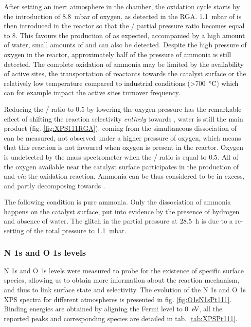 After setting an inert atmosphere in the chamber, the oxidation cycle starts by the introduction of \qty{8.8}{\milli\bar} of oxygen, as detected in the RGA.
\qty{1.1}{\milli\bar} of  is then introduced in the reactor so that the / partial pressure ratio becomes equal to \num{8}.
This favours the production of  as expected, accompanied by a high amount of water, small amounts of  and  can also be detected.
Despite the high pressure of oxygen in the reactor, approximately half of the pressure of ammonia is still detected.
The complete oxidation of ammonia may be limited by the availability of active sites, the transportation of reactants towards the catalyst surface or the relatively low temperature compared to industrial conditions (\qty{>700}{\degreeCelsius}) which can for example impact the active sites turnover frequency.

Reducing the / ratio to \num{0.5} by lowering the oxygen pressure has the remarkable effect of shifting the reaction selectivity \textit{entirely} towards , water is still the main product (fig. \ref{fig:XPS111RGA}).
 coming from the simultaneous dissociation of  can be measured, not observed under a higher pressure of oxygen, which means that this reaction is not favoured when oxygen is present in the reactor.
Oxygen is undetected by the mass spectrometer when the / ratio is equal to \num{0.5}.
All of the oxygen available near the catalyst surface participates in the production of  and  \textit{via} the oxidation reaction.
Ammonia can be thus considered to be in excess, and partly decomposing towards .

The following condition is pure ammonia.
Only the dissociation of ammonia happens on the catalyst surface, put into evidence by the presence of hydrogen and absence of water.
The glitch in the partial pressure at \qty{28.5}{\hour} is due to a re-setting of the total pressure to \qty{1.1}{\milli\bar}.

\subsubsection{N 1s and O 1s levels}

N 1s and O 1s levels were measured to probe for the existence of specific surface species, allowing us to obtain more information about the reaction mechanism, and thus to link surface state and selectivity.
The evolution of the N 1s and O 1s XPS spectra for different atmospheres is presented in fig. \ref{fig:O1sN1sPt111}.
Binding energies are obtained by aligning the Fermi level to \qty{0}{\eV}, all the reported peaks and corresponding species are detailed in tab. \ref{tab:XPSPt111}.

